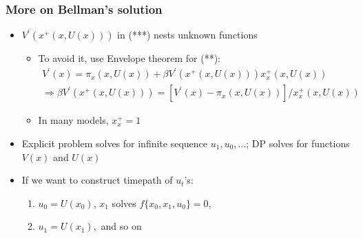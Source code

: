 \documentclass[bigger,handout]{beamer}
\begin{document}
\begin{frame}%

\frametitle{More on Bellman's solution}

\begin{itemize}
\item $V^{\prime }(x^{+}(x,U(x)))$ in (***) nests unknown functions

\begin{itemize}
\item To avoid it, use Envelope theorem for (**):%
\begin{gather*}
V^{\prime }(x)=\pi _{x}(x,U(x))+\beta V^{\prime }(x^{+}\left( x,U(x)\right)
)x_{x}^{+}\left( x,U(x)\right) \\
\Rightarrow \beta V^{\prime }(x^{+}\left( x,U(x)\right) )=\left[ V^{\prime
}(x)-\pi _{x}(x,U(x))\right] /x_{x}^{+}\left( x,U(x)\right)
\end{gather*}

\item In many models, $x_{x}^{+}=1$
\end{itemize}

\item Explicit problem solves for infinite sequence $u_{1},u_{0},...$;%
\newline
DP solves for functions $V(x)$ and $U\left( x\right) $

\item If we want to construct timepath of $u_{t}$'s:

\begin{enumerate}
\item $u_{0}=U\left( x_{0}\right) $, $x_{1}$ solves $f\{x_{0},x_{1},u_{0}%
\}=0 $,

\item $u_{1}=U\left( x_{1}\right) ,$ and so on
\end{enumerate}
\end{itemize}



\end{frame}%
\end{document}
